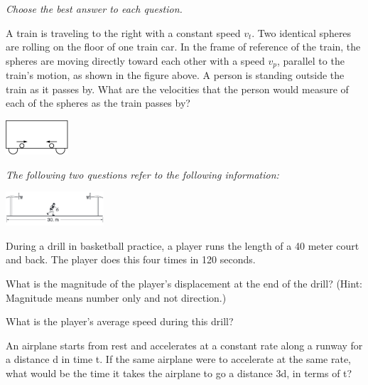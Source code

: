 \documentclass[10pt]{examdesign}
\begin{document}
\begin{multiplechoice} [title={Multiple Choice},
	rearrange=yes]
\textit{Choose the best answer to each question.}

	
\begin{question}
A train is traveling to the right with a constant speed $v_t$.  Two identical spheres are rolling on the floor of one train car.  In the frame of reference of the train, the spheres are moving directly toward each other with a speed $v_p$, parallel to the train's motion, as shown in the figure above.  A person is standing outside the train as it passes by.  What are the velocities that the person would measure of each of the spheres as the train passes by? 

\begin{center}
		\includegraphics[height=0.5in]{train2.png}  
\end{center}



\end{question}

\begin{block}
 \textit{	The following two questions refer to the following information:}
 	
\includegraphics[height=0.5in]{bball.png} 

During a drill in basketball practice, a player runs the length of a 40 meter court and back.  The player does this four times in 120 seconds. 

\begin{question}
	What is the magnitude of the player's displacement at the end of the drill? (Hint: Magnitude means number only and not direction.)

\end{question}


	\begin{question}
What is the player's average speed during this drill? 

\end{question}
\end{block}


	\begin{question}
An airplane starts from rest and accelerates at a constant rate along a runway for a distance d in time t.  If the same airplane were to accelerate at the same rate, what would be the time it takes the airplane to go a distance 3d, in terms of t?


\end{question}
\end{multiplechoice}
\end{document}
